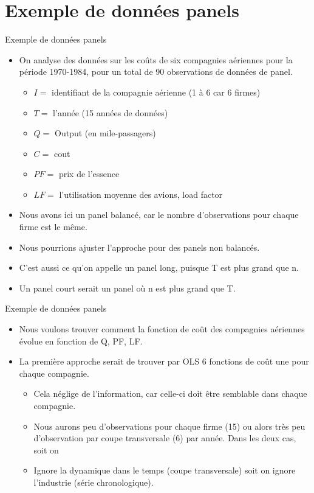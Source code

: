\documentclass{beamer}
\begin{document}
\section{Exemple de données panels}
\frame{\tableofcontents[current]}
\begin{frame}{Exemple de données panels}
\begin{itemize}
\item On analyse des données sur les coûts de six compagnies aériennes pour la période 1970-1984, pour un total de 90 observations de données de panel.
\begin{itemize}
\item $I=$ identifiant de la compagnie aérienne (1 à 6 car 6 firmes)
\item $T=$ l’année (15 années de données)
\item $Q=$ Output (en mile-passagers)
\item $C=$ cout
\item $PF=$ prix de l’essence
\item $LF=$ l’utilisation moyenne des avions, load factor
\end{itemize}
\item Nous avons ici un panel balancé, car le nombre d’observations pour chaque firme est le même.
\item Nous pourrions ajuster l’approche pour des panels non balancés. 
\item C’est aussi ce qu’on appelle un panel long, puisque T est plus grand que n. 
\item Un panel court serait un panel où n est plus grand que T.
\end{itemize}
\end{frame}


\begin{frame}{Exemple de données panels}
\begin{itemize}
\item Nous voulons trouver comment la fonction de coût des compagnies aériennes évolue en fonction de Q, PF, LF.
\item La première approche serait de trouver par OLS 6 fonctions de coût une pour chaque compagnie.
\begin{itemize}
\item Cela néglige de l’information, car celle-ci doit être semblable dans chaque compagnie.
\item Nous aurons peu d’observations pour chaque firme (15) ou alors très peu d’observation par coupe transversale (6) par année. Dans les deux cas, soit on
\item Ignore la dynamique dans le temps (coupe transversale) soit on ignore l’industrie (série chronologique).
\end{itemize}

\end{itemize}
\end{frame}
\end{document}
